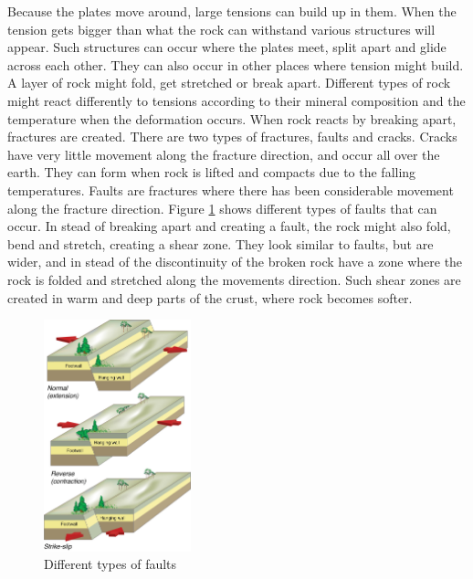 \documentclass[a4paper,12pt]{report}
\begin{document}
Because the plates move around, large tensions can build up in them. When the tension gets bigger than what the rock can withstand various structures will appear. Such structures can occur where the plates meet, split apart and glide across each other. They can also occur in other places where tension might build. A layer of rock might fold, get stretched or break apart. Different types of rock might react differently to tensions according to their mineral composition and the temperature when the deformation occurs. When rock reacts by breaking apart, fractures are created. There are two types of fractures, faults and cracks. Cracks have very little movement along the fracture direction, and occur all over the earth. They can form when rock is lifted and compacts due to the falling temperatures. Faults are fractures where there has been considerable movement along the fracture direction. Figure \ref{fig:faults} shows different types of faults that can occur. In stead of breaking apart and creating a fault, 
the rock might also fold, bend and stretch, creating a shear zone. They look similar to faults, but are wider, and in stead of the discontinuity of the broken rock have a zone where the rock is folded and stretched along the movements direction. Such shear zones are created in warm and deep parts of the crust, where rock becomes softer.

\begin{figure}

  \begin{center}
    \includegraphics[width=0.38\textwidth]{thesis/geo/english/faults.jpg}
  \end{center}
 
  \caption{Different types of faults}
  \vspace{15pt}
  \label{fig:faults}
  
\end{figure}
\end{document}
